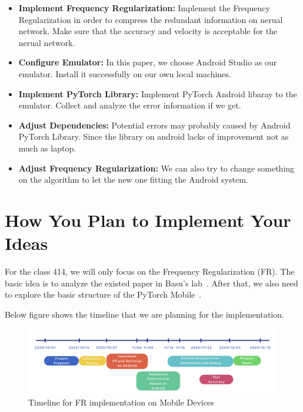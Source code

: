 \documentclass{article}
\begin{document}
\begin{itemize}
	\item \textbf{Implement Frequency Regularization:} Implement the Frequency Regularization in order to compress the redundant information on nerual network. Make sure that the accuracy and velocity is acceptable for the nerual network.
	
	\item \textbf{Configure Emulator:} In this paper, we choose Android Studio as our emulator. Install it successfully on our own local machines.
	
	\item \textbf{Implement PyTorch Library:} Implement PyTorch Android libaray to the emulator. Collect and analyze the error information if we get.
	
	\item \textbf{Adjust Dependencies:} Potential errors may probably caused by Android PyTorch Library. Since the library on android lacks of improvement not as much as laptop.
	
	\item \textbf{Adjust Frequency Regularization:} We can also try to change something on the algorithm to let the new one fitting the Android system.
	
\end{itemize}

\section{How You Plan to Implement Your Ideas}

For the class 414, we will only focus on the Frequency Regularization (FR). The basic idea is to analyze the existed paper in Basu's lab~\cite{zhao2023frequency}. After that, we also need to explore the basic structure of the PyTorch Mobile~\cite{pytorch_mobile}.

Below figure shows the timeline that we are planning for the implementation. 
\begin{figure}[!h]
\centering
\includegraphics[width=1\textwidth]{./figure/timeline.png}
\caption{Timeline for FR implementation on Mobile Devices}
 \label{timeline_fig}
\end{figure}
\end{document}
